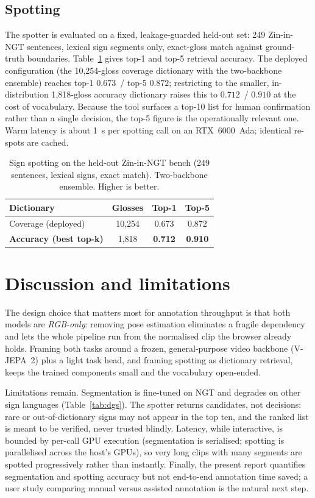 \documentclass[11pt]{article}
\begin{document}
\subsection{Spotting}
The spotter is evaluated on a fixed, leakage-guarded held-out set: 249 Zin-in-NGT sentences,
lexical sign segments only, exact-gloss match against ground-truth boundaries.
Table~\ref{tab:spot} gives top-1 and top-5 retrieval accuracy. The deployed configuration (the
10{,}254-gloss coverage dictionary with the two-backbone ensemble) reaches top-1 $0.673$~/ top-5
$0.872$; restricting to the smaller, in-distribution 1{,}818-gloss accuracy dictionary raises
this to $\mathbf{0.712}$~/ $\mathbf{0.910}$ at the cost of vocabulary. Because the tool surfaces
a top-10 list for human confirmation rather than a single decision, the top-5 figure is the
operationally relevant one. Warm latency is about 1~s per spotting call on an RTX~6000~Ada;
identical re-spots are cached.

\begin{table}[t]
\centering
\caption{Sign spotting on the held-out Zin-in-NGT bench (249 sentences, lexical signs, exact
match). Two-backbone ensemble. Higher is better.}
\label{tab:spot}
\begin{tabular}{lccc}
\toprule
Dictionary & Glosses & Top-1 & Top-5 \\
\midrule
Coverage (deployed) & 10{,}254 & 0.673 & 0.872 \\
\textbf{Accuracy (best top-k)} & 1{,}818 & \textbf{0.712} & \textbf{0.910} \\
\bottomrule
\end{tabular}
\end{table}

\section{Discussion and limitations}\label{sec:disc}
The design choice that matters most for annotation throughput is that both models are
\emph{RGB-only}: removing pose estimation eliminates a fragile dependency and lets the whole
pipeline run from the normalised clip the browser already holds. Framing both tasks around a
frozen, general-purpose video backbone (V-JEPA~2) plus a light task head, and framing spotting
as dictionary retrieval, keeps the trained components small and the vocabulary open-ended.

Limitations remain. Segmentation is fine-tuned on NGT and degrades on other sign languages
(Table~\ref{tab:dgs}). The spotter returns candidates, not decisions: rare or out-of-dictionary
signs may not appear in the top ten, and the ranked list is meant to be verified, never trusted
blindly. Latency, while interactive, is bounded by per-call GPU execution (segmentation is
serialised; spotting is parallelised across the host's GPUs), so very long clips with many
segments are spotted progressively rather than instantly. Finally, the present report quantifies
segmentation and spotting accuracy but not end-to-end annotation time saved; a user study
comparing manual versus assisted annotation is the natural next step.
\end{document}
